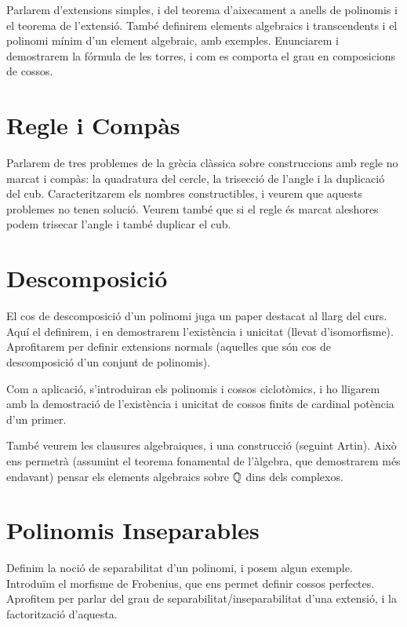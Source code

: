 \documentclass[
]{book}
\theoremstyle{definition}
\theoremstyle{definition}
\theoremstyle{definition}
\theoremstyle{definition}
\theoremstyle{remark}
\begin{document}
Parlarem d'extensions simples, i del teorema d'aixecament a anells de polinomis i el teorema de l'extensió.
També definirem elements algebraics i transcendents i el polinomi mínim d'un element algebraic, amb exemples.
Enunciarem i demostrarem la fórmula de les torres, i com es comporta el grau en composicions de cossos.

\hypertarget{regle-i-compuxe0s}{%
\chapter{Regle i Compàs}\label{regle-i-compuxe0s}}

Parlarem de tres problemes de la grècia clàssica sobre construccions amb regle no marcat i compàs: la quadratura del cercle,
la trisecció de l'angle i la duplicació del cub. Caracteritzarem els nombres constructibles, i veurem que aquests problemes
no tenen solució. Veurem també que si el regle és marcat aleshores podem trisecar l'angle i també duplicar el cub.

\hypertarget{descomposiciuxf3}{%
\chapter{Descomposició}\label{descomposiciuxf3}}

El cos de descomposició d'un polinomi juga un paper destacat al llarg del curs.
Aquí el definirem, i en demostrarem l'existència i unicitat (llevat d'isomorfisme).
Aprofitarem per definir extensions normals (aquelles que són cos de descomposició d'un conjunt de polinomis).

Com a aplicació, s'introduiran els polinomis i cossos ciclotòmics, i ho lligarem amb la
demostració de l'existència i unicitat de cossos finits de cardinal potència d'un primer.

També veurem les clausures algebraiques, i una construcció (seguint Artin). Això ens permetrà (assumint el teorema fonamental
de l'àlgebra, que demostrarem més endavant) pensar els elements algebraics sobre \(\mathbb{Q}\) dins dels complexos.

\hypertarget{polinomis-inseparables}{%
\chapter{Polinomis Inseparables}\label{polinomis-inseparables}}

Definim la noció de separabilitat d'un polinomi, i posem algun exemple. Introduïm el morfisme de Frobenius,
que ens permet definir cossos perfectes. Aprofitem per parlar del grau de separabilitat/inseparabilitat d'una
extensió, i la factorització d'aquesta.
\end{document}
